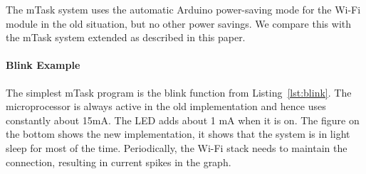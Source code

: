 \documentclass[runningheads]{llncs}
\begin{document}
The mTask system uses the automatic Arduino power-saving mode for the Wi-Fi module in the old situation, but no other power savings.
We compare this with the mTask system extended as described in this paper.




\paragraph{Blink Example}

The simplest mTask program is the blink function from Listing~\ref{lst:blink}.
The microprocessor is always active in the old implementation and hence uses constantly about 15mA.
The LED adds about 1 mA when it is on.
The figure on the bottom shows the new implementation, it shows that the system is in light sleep for most of the time.
Periodically, the Wi-Fi stack needs to maintain the connection, resulting in current spikes in the graph.
\end{document}
